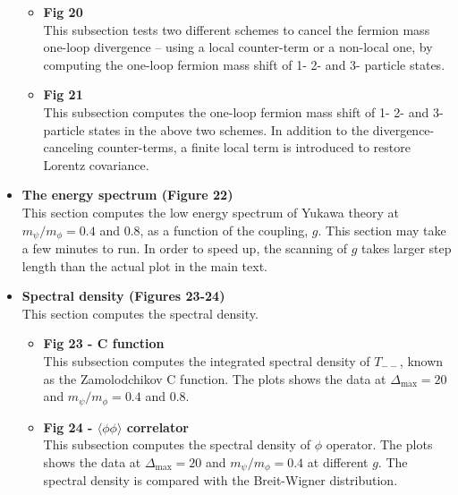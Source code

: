 \documentclass[12pt]{article}
\def\>{\rangle}
\def\<{\langle}
\newcommand\De\Delta
\newcommand{\Dmax}{\De_{\max}}
\begin{document}
\begin{itemize}
\begin{itemize}
  \item \textbf{Fig 20}\\
  This subsection tests two different schemes to cancel the fermion mass one-loop divergence -- using a local counter-term or a non-local one, by computing the one-loop fermion mass shift of 1- 2- and 3- particle states.
  \item \textbf{Fig 21}\\
  This subsection computes the one-loop fermion mass shift of 1- 2- and 3- particle states in the above two schemes. In addition to the divergence-canceling counter-terms, a finite local term is introduced to restore Lorentz covariance. 
  \end{itemize}
\item \textbf{The energy spectrum (Figure 22)}\\
This section computes the low energy spectrum of Yukawa theory at $m_\psi/m_\phi = 0.4$ and $0.8$, as a function of the coupling, $g$. This section may take a few minutes to run. In order to speed up, the scanning of $g$ takes larger step length than the actual plot in the main text.
\item \textbf{Spectral density (Figures 23-24)}\\
This section computes the spectral density.
  \begin{itemize}
  \item \textbf{Fig 23 - C function}\\
  This subsection computes the integrated spectral density of $T_{--}$, known as the Zamolodchikov C function. The plots shows the data at $\Dmax=20$ and $m_\psi/m_\phi = 0.4$ and $0.8$.
  \item \textbf{Fig 24 - $\<\phi\phi\>$ correlator}\\
  This subsection computes the spectral density of $\phi$ operator. The plots shows the data at $\Dmax=20$ and $m_\psi/m_\phi = 0.4$ at different $g$. The spectral density is compared with the Breit-Wigner distribution.
  \end{itemize}
\end{itemize}
\end{document}
